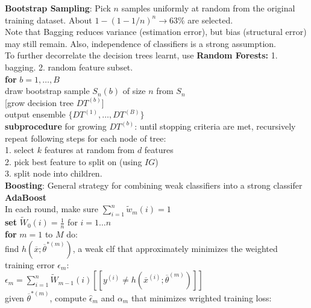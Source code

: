 \documentclass[10pt, letterpaper]{article}
\begin{document}
\begin{multicols*}{2}
\begin{figure}[H]
\end{figure}
\noindent\textbf{Bootstrap Sampling}: Pick $n$ samples uniformly at random from the original training dataset. About $1-(1-1/n)^n\rightarrow63\%$ are selected.\\
Note that Bagging reduces variance (estimation error), but bias (structural error) may still remain. Also, independence of classifiers is a strong assumption.\\
To further decorrelate the decision trees learnt, use \textbf{Random Forests:} 1. bagging. 2. random feature subset.\\
\textbf{for} $b=1,\dots,B$\\
\hspace*{2ex} draw bootstrap sample $S_n(b)$ of size $n$ from $S_n$\\
\hspace*{2ex} [grow decision tree $DT^{(b)}$]\\
output ensemble $\{DT^{(1)},\dots,DT^{(B)}\}$\\
\textbf{subprocedure} for growing $DT^{(b)}$:
until stopping criteria are met, recursively repeat following steps
for each node of tree:\\
1. select $k$ features at random from $d$ features\\
2. pick best feature to split on (using $IG$)\\
3. split node into children.\\
\textbf{Boosting}: General strategy for combining weak classifiers into a strong classifer\\
\textbf{AdaBoost}\\
In each round, make sure $\sum_{i=1}^{n} \widetilde{w}_{m}(i)=1$\\
\textbf{set} $\widetilde{W}_{0}(i)=\frac{1}{n}$ for $i=1 \ldots n$\\
\textbf{for} $m=1$ to $M$ do:\\
\hspace*{2ex}find $h\left(\overline{x} ; \overline{\theta}^{*(m)}\right)$, a weak clf that approximately minimizes the \hspace*{2ex}weighted training error $\epsilon_m$:\\
\hspace*{4ex}$\boxed{\epsilon_{m}=\sum_{i=1}^{n} \widetilde{W}_{m-1}(i)\left[\left[y^{(i)} \neq h\left(\overline{x}^{(i)} ; \overline{\theta}^{(m)}\right)\right]\right]}$\\
\hspace*{2ex}given $\overline{\theta}^{*(m)}$, compute $\hat{\epsilon}_{m}$ and $\alpha_m$ that minimizes wrighted training \hspace*{2ex}loss:

\end{multicols*}
\end{document}
